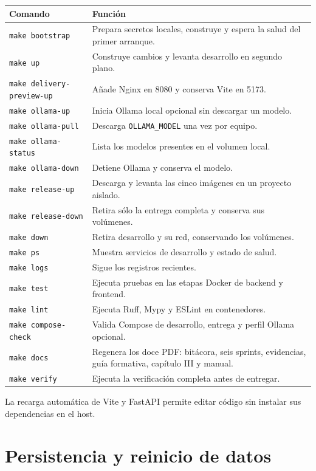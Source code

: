 \documentclass[11pt,letterpaper]{article}
\newcommand{\file}[1]{\texttt{#1}}
\begin{document}
\begin{tabularx}{\textwidth}{@{}l X@{}}
  \toprule
  Comando & Función \\
  \midrule
  \file{make bootstrap} & Prepara secretos locales, construye y espera la salud del primer arranque. \\
  \file{make up} & Construye cambios y levanta desarrollo en segundo plano. \\
  \file{make delivery-preview-up} & Añade Nginx en 8080 y conserva Vite en 5173. \\
  \file{make ollama-up} & Inicia Ollama local opcional sin descargar un modelo. \\
  \file{make ollama-pull} & Descarga \file{OLLAMA\_MODEL} una vez por equipo. \\
  \file{make ollama-status} & Lista los modelos presentes en el volumen local. \\
  \file{make ollama-down} & Detiene Ollama y conserva el modelo. \\
  \file{make release-up} & Descarga y levanta las cinco imágenes en un proyecto aislado. \\
  \file{make release-down} & Retira sólo la entrega completa y conserva sus volúmenes. \\
  \file{make down} & Retira desarrollo y su red, conservando los volúmenes. \\
  \file{make ps} & Muestra servicios de desarrollo y estado de salud. \\
  \file{make logs} & Sigue los registros recientes. \\
  \file{make test} & Ejecuta pruebas en las etapas Docker de backend y frontend. \\
  \file{make lint} & Ejecuta Ruff, Mypy y ESLint en contenedores. \\
  \file{make compose-check} & Valida Compose de desarrollo, entrega y perfil Ollama opcional. \\
  \file{make docs} & Regenera los doce PDF: bitácora, seis sprints, evidencias, guía formativa, capítulo III y manual. \\
  \file{make verify} & Ejecuta la verificación completa antes de entregar. \\
  \bottomrule
\end{tabularx}

La recarga automática de Vite y FastAPI permite editar código sin instalar sus dependencias en el host.

\section{Persistencia y reinicio de datos}
\end{document}

